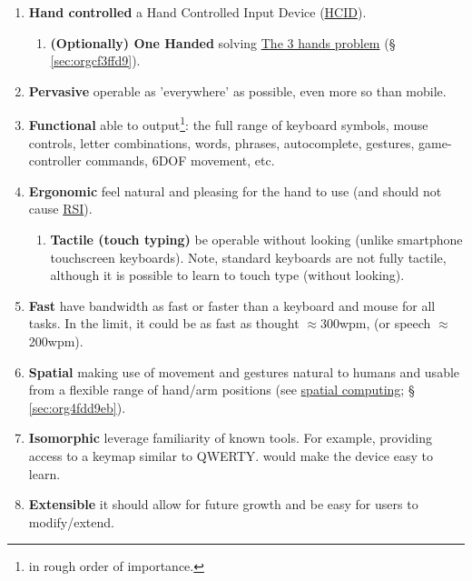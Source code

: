 \documentclass[logo,bsc,singlespacing,parskip]{infthesis}
\begin{document}
\begin{enumerate}
\item \textbf{Hand controlled} a Hand Controlled Input Device (\hyperref[orgf95a76e]{HCID}).

\begin{enumerate}
\item \textbf{(Optionally) One Handed} solving \hyperref[sec:orgcf3ffd9]{The 3 hands problem} (§ \ref{sec:orgcf3ffd9}).
\end{enumerate}

\item \textbf{Pervasive} operable as 'everywhere' as possible, even more so than mobile.

\item \textbf{Functional} able to output\footnote{in rough order of importance.}: the full range of keyboard symbols, mouse controls, letter combinations, words, phrases, autocomplete, gestures, game-controller commands, 6DOF movement, etc.

\item \textbf{Ergonomic} feel natural and pleasing for the hand to use (and should not cause \hyperref[org503fc2d]{RSI}).

\begin{enumerate}
\item \textbf{Tactile (touch typing)} be operable without looking (unlike smartphone touchscreen keyboards). Note, standard keyboards are not fully tactile, although it is possible to learn to touch type (without looking).
\end{enumerate}

\item \textbf{Fast} have bandwidth as fast or faster than a keyboard and mouse for all tasks. In the limit, it could be as fast as thought \(\approx\)300wpm, (or speech \(\approx\)200wpm).

\item \textbf{Spatial} making use of movement and gestures natural to humans and usable from a flexible range of hand/arm positions (see \hyperref[sec:org4fdd9eb]{spatial computing}; § \ref{sec:org4fdd9eb}).

\item \textbf{Isomorphic} leverage familiarity of known tools. For example, providing access to a keymap similar to QWERTY. would make the device easy to learn.

\item \textbf{Extensible} it should allow for future growth and be easy for users to modify/extend.
\end{enumerate}
\end{document}
